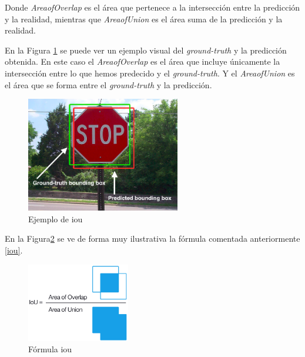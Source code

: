 Donde \textit{AreaofOverlap} es el área que pertenece a la intersección entre la predicción y la realidad, mientras que \textit{AreaofUnion} es el área suma de la predicción y la realidad.

En la Figura \ref{fig.ejemplo_iou} se puede ver un ejemplo visual del \textit{ground-truth} y la predicción obtenida. En este caso el \textit{AreaofOverlap} es el área que incluye únicamente la intersección entre lo que hemos predecido y el \textit{ground-truth}. Y el \textit{AreaofUnion} es el área que se forma entre el \textit{ground-truth} y la predicción.

\begin{figure}[H]
  \begin{center}
    \includegraphics[width=0.6\textwidth]{figures/Herramientas/iou.png}
		\caption{Ejemplo de \acrshort{iou}}
		\label{fig.ejemplo_iou}
		\end{center}
\end{figure}

En la Figura\ref{fig.formula_iou} se ve de forma muy ilustrativa la fórmula comentada anteriormente \ref{iou}.

\begin{figure}[H]
  \begin{center}
    \includegraphics[width=0.4\textwidth]{figures/Herramientas/iou_formula.png}
		\caption{Fórmula \acrshort{iou}}
		\label{fig.formula_iou}
		\end{center}
\end{figure}


